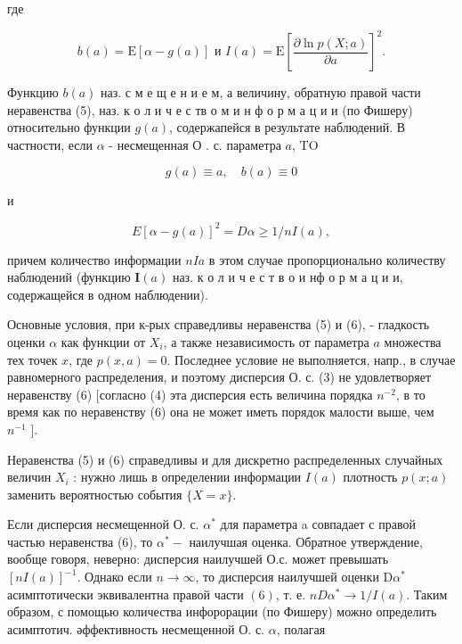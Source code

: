 \documentclass[10pt]{article}
\begin{document}
где



\[

b(a)=\mathrm{E}[\alpha-g(a)] \text { и } I(a)=\mathrm{E}\left[\frac{\partial \ln p(X ; a)}{\partial a}\right]^{2} .

\]



Функцию $b(a)$ наз. с м е щ е н и е м, а величину, обратную правой части неравенства (5), наз. к о л и ч е с тв о м и н ф о р м а ц и и (по Фишеру) относительно функции $g(a)$, содержапейся в результате наблюдений. В частности, если $\alpha$ - несмещенная О . с. параметра $a$, TO



\[

g(a) \equiv a, \quad b(a) \equiv 0

\]



и



\[

E[\alpha-g(a)]^{2}=D \alpha \geqslant 1 / n I(a),

\]



причем количество информации $n I a$ в этом случае пропорционально количеству наблюдений (функцию $\boldsymbol{I}(a)$ наз. к о л и ч е с т в о и нф о р м а ц и и, содержащейся в одном наблюдении).



Основные условия, при к-рых справедливы неравенства (5) и (6), - гладкость оценки $\alpha$ как функции от $X_{i}$, а также независимость от параметра $a$ множества тех точек $x$, где $p(x, a)=0$. Последнее условие не выполняется, напр., в случае равномерного распределения, и поэтому дисперсия $О$. с. (3) не удовлетворяет неравенству (6) [согласно (4) эта дисперсия есть величина порядка $n^{-2}$, в то время как по неравенству (6) она не может иметь порядок малости выше, чем $n^{-1}$ ].



Неравенства (5) и (6) справедливы и для дискретно распределенных случайных величин $X_{i}$ : нужно лишь в определении информации $I(a)$ плотность $p(x ; a)$ заменить вероятностью события $\{X=x\}$.



Если дисперсия несмещенной О. с. $\alpha^{*}$ для параметра a совпадает с правой частью неравенства (6), то $\alpha^{*}-$ наилучшая оценка. Обратное утверждение, вообще говоря, неверно: дисперсия наилучшей О.с. может превышать $[n I(a)]^{-1}$. Однако если $n \rightarrow \infty$, то дисперсия наилучшей оценки $\mathrm{D} \alpha^{*}$ асимптотически эквивалентна правой части $(6)$, т. е. $n D \alpha^{*} \rightarrow 1 / I(a)$. Таким образом, с помощью количества инфорорации (по Фишеру) можно определить асимптотич. әффективность несмещенной О. с. $\alpha$, полагая
\end{document}
